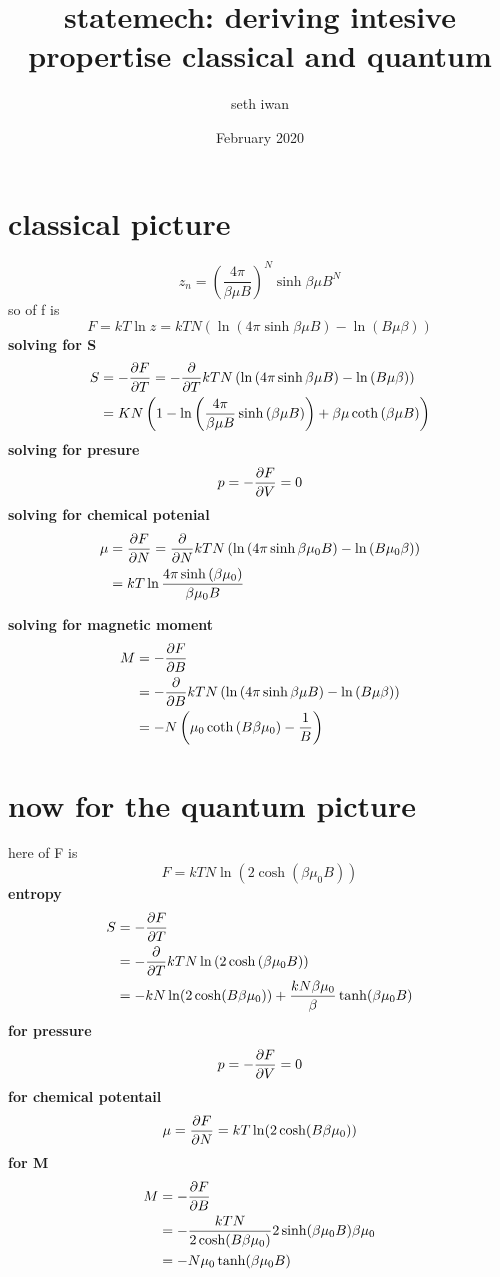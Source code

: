 \documentclass{article}
\title{statemech: deriving intesive propertise classical and quantum}
\author{seth iwan }
\date{February 2020}
\newcommand{\nm}{\begin{equation}}
\newcommand{\enm}{\end{equation}}
\newcommand{\lp}{\left(}
\newcommand{\rp}{\right)}
\begin{document}
\maketitle
\section{classical picture}
\nm
z_n=\lp\frac{4\pi}{\beta \mu B}\rp^N \sinh{\beta \mu B}^N
\enm
so of f is 
\nm
F=kT\ln{z} = kTN\lp \ln{\lp4\pi\sinh{\beta\mu B}\rp}-\ln{\lp B\mu\beta\rp}\rp
\enm
\textbf{solving for S}
\begin{align*}
S&=-\pdv{F}{T}=-\pdv{T}  kTN\lp \ln{\lp4\pi\sinh{\beta\mu B}\rp}-\ln{\lp B\mu\beta\rp}\rp \\
&=KN\lp 1-\ln{\lp\frac{4\pi}{\beta\mu B}\sinh{\lp\beta\mu B\rp}\rp}+\beta\mu\coth{\lp\beta\mu B\rp}\rp
\end{align*}
\textbf{solving for presure}
\nm
p=-\pdv{F}{V}=0
\enm
\textbf{solving for chemical potenial}
\begin{align*}
\mu&=\pdv{F}{N}=\pdv{N} kTN\lp \ln{\lp4\pi\sinh{\beta\mu_0 B}\rp}-\ln{\lp B\mu_0\beta\rp}\rp \\
&=kT\ln{\frac{4\pi\sinh{\lp \beta\mu_0\rp}}{\beta \mu_0 B}}
\end{align*}

\textbf{solving for magnetic moment}
\begin{align*}
M&=-\pdv{F}{B} \\
&= -\pdv{B} kTN\lp \ln{\lp4\pi\sinh{\beta\mu B}\rp}-\ln{\lp B\mu\beta\rp}\rp \\
&= -N\lp \mu_0\coth{\lp B\beta\mu_0\rp} -\frac{1}{B}\rp
\end{align*}

\section{now for the quantum picture}
 here of F is
 \nm
 F=kTN\ln{\lp2\cosh{\lp\beta\mu_0 B\rp}\rp}
 \enm
\textbf{entropy}
\begin{align*}
S&=-\pdv{F}{T} \\
&=-\pdv{T} kTN\ln{\lp2\cosh{\lp\beta\mu_0 B\rp}\rp}\\
&= -kN\ln(2\cosh(B\beta\mu_0))+\frac{kN\beta\mu_0}{\beta}\tanh(\beta\mu_0B)
\end{align*}
\textbf{for pressure}
\nm
p=-\pdv{F}{V}=0
\enm
\textbf{for chemical potentail}
\begin{align*}
\mu=\pdv{F}{N} = kT\ln(2\cosh(B\beta\mu_0))
\end{align*}
\textbf{for M}
\begin{align*}
M&=-\pdv{F}{B} \\
&= -\frac{kTN}{2\cosh(B\beta\mu_0)} 2\sinh(\beta\mu_0 B)\beta\mu_0 \\
&= -N\mu_0 \tanh(\beta\mu_0 B)
\end{align*}
\end{document}
